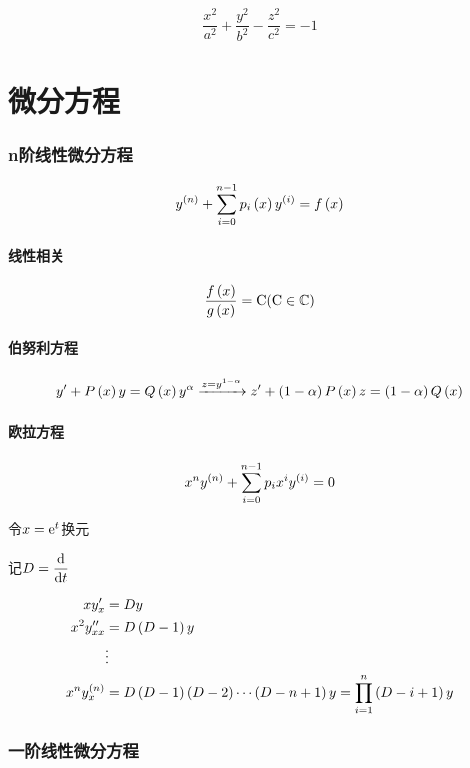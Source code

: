 \documentclass{article}
\begin{document}
\[\frac{x^2}{a^2}+\frac{y^2}{b^2}-\frac{z^2}{c^2}=-1\]

\part{微分方程}

\section{n阶线性微分方程}

\[y^{\left(n\right)}+\sum_{i=0}^{n-1}p_i\left(x\right)y^{\left(i\right)}=f\left(x\right)\label{LinearDifferentialEquationsOfOrderN}\]

\subsection{线性相关}

\[\frac{f\left(x\right)}{g\left(x\right)}=\mathrm C(\mathrm C\in\mathbb C)\]

\subsection{伯努利方程}

\[y^\prime+P\left(x\right)y=Q\left(x\right)y^\alpha\xrightarrow{z=y^{1-\alpha}} z^\prime+\left(1-\alpha\right)P\left(x\right)z=\left(1-\alpha\right)Q\left(x\right)\]

\subsection{欧拉方程}

\[x^ny^{\left(n\right)}+\sum_{i=0}^{n-1}p_ix^iy^{\left(i\right)}=0\]

令$x=\mathrm e^t$换元

记$D=\dfrac{\mathrm d}{\mathrm d t}$

\[\begin{aligned}
        xy_x^\prime              & =Dy                                                      \\
        x^2y_{xx}^{\prime\prime} & =D\left(D-1\right)y                                               \\
                                 & \vdots                                                   \\
        x^ny_x^{\left(n\right)}           & =D\left(D-1\right)\left(D-2\right)\cdots\left(D-n+1\right)y=\prod_{i=1}^n\left(D-i+1\right)y
    \end{aligned}\]

\section{一阶线性微分方程}
\end{document}
